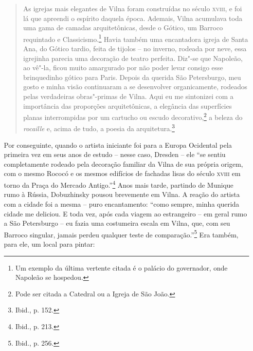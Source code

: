 \begin{quote}
As igrejas mais elegantes de Vilna foram construídas no século \textsc{xviii}, e foi
lá que apreendi o espírito daquela época. Ademais, Vilna acumulava toda
uma gama de camadas arquitetônicas, desde o Gótico, um Barroco
requintado e Classicismo.\footnote{Um exemplo da última vertente citada é o palácio do governador, onde Napoleão se
hospedou.} Havia também uma encantadora igreja de Santa Ana, do Gótico
tardio, feita de tijolos -- no inverno, rodeada por neve, essa igrejinha
parecia uma decoração de teatro perfeita. Diz"-se que Napoleão, ao vê"-la,
ficou muito amargurado por não poder levar consigo esse brinquedinho
gótico para Paris. Depois da querida São Petersburgo, meu gosto e minha
visão continuaram a se desenvolver organicamente, rodeados pelas
verdadeiras obras"-primas de Vilna. Aqui eu me sintonizei com a
importância das proporções arquitetônicas, a elegância das superfícies
planas interrompidas por um cartucho ou 
escudo decorativo,\footnote{Pode ser citada a Catedral ou a Igreja de São João.} a beleza do \textit{rocaille} e, acima de
tudo, a poesia da arquitetura.\footnote{Ibid., p. 152.}
\end{quote}

Por conseguinte, quando o artista iniciante foi para a Europa Ocidental
pela primeira vez em seus anos de estudo -- nesse caso, Dresden -- ele
``se sentiu completamente rodeado pela decoração familiar da Vilna de
sua própria origem, com o mesmo Rococó e os mesmos edifícios de fachadas
lisas do século \textsc{xviii} em torno da Praça do Mercado Antigo.''\footnote{Ibid., p. 213.} Anos mais tarde, partindo de Munique rumo à Rússia, Dobuzhinsky pousou brevemente em Vilna. A reação do artista com a cidade
foi a mesma -- puro encantamento: ``como sempre, minha querida cidade me
deliciou. E toda vez, após cada viagem ao estrangeiro -- em geral rumo a
São Petersburgo -- eu fazia uma costumeira escala em Vilna, que, com seu
Barroco singular, jamais perdeu qualquer teste de
comparação.''\footnote{Ibid., p. 256.} Era também, para ele, um local
para pintar:

